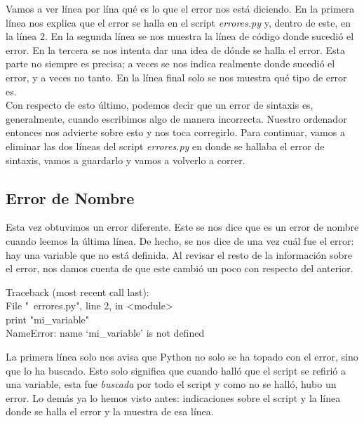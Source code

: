\documentclass[10pt,letterpaper]{article}
\newenvironment{Code}
{
\begin{lrbox}{\selvestebox}%
\begin{minipage}{\dimexpr\columnwidth-2\fboxsep\relax}
\fontfamily{\ttdefault}\selectfont
}
{\end{minipage}\end{lrbox}%
\begin{center}
\colorbox{light-gray}{\usebox{\selvestebox}}
\end{center}
}
\begin{document}
Vamos a ver l\'inea por l\'ina qu\'e es lo que el error nos est\'a diciendo. En la primera l\'inea nos explica que el error se halla en el script \textit{errores.py} y, dentro de este, en la l\'inea 2. En la segunda l\'inea se nos muestra la l\'inea de c\'odigo donde sucedi\'o el error. En la tercera se nos intenta dar una idea de d\'onde se halla el error. Esta parte no siempre es precisa; a veces se nos indica realmente donde sucedi\'o el error, y a veces no tanto. En la l\'inea final solo se nos muestra qu\'e tipo de error es.\\

Con respecto de esto \'ultimo, podemos decir que un error de sintaxis es, generalmente, cuando escribimos algo de manera incorrecta. Nuestro ordenador entonces nos advierte sobre esto y nos toca corregirlo. Para continuar, vamos a eliminar las dos l\'ineas del script \textit{errores.py} en donde se hallaba el error de sintaxis, vamos a guardarlo y vamos a volverlo a correr.

\subsection{Error de Nombre}
Esta vez obtuvimos un error diferente. Este se nos dice que es un error de nombre cuando leemos la \'ultima l\'inea. De hecho, se nos dice de una vez cu\'al fue el error: hay una variable que no est\'a definida. Al revisar el resto de la informaci\'on sobre el error, nos damos cuenta de que este cambi\'o un poco con respecto del anterior.

\begin{Code}
{\color{red}Traceback (most recent call last):\\
\hspace*{4mm} File "\ \hspace{-2mm}errores.py", line 2, in <module>\\
\hspace*{8mm} print "mi\_variable"\\
NameError: name `mi\_variable' is not defined}
\end{Code}

La primera l\'inea solo nos avisa que Python no solo se ha topado con el error, sino que lo ha buscado. Esto solo significa que cuando hall\'o que el script se refiri\'o a una variable, esta fue \emph{buscada} por todo el script y como no se hall\'o, hubo un error. Lo dem\'as ya lo hemos visto antes: indicaciones sobre el script y la l\'inea donde se halla el error y la muestra de esa l\'inea.\\
\end{document}
